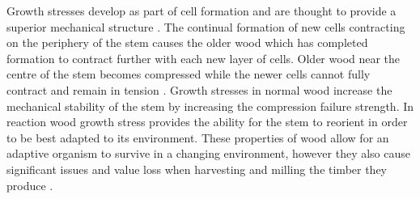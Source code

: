 Growth stresses develop as part of cell formation and are thought to provide a
superior mechanical structure \cite{mattheck1997wood}. The continual formation of new cells contracting
on the periphery of the stem causes the older wood which has completed formation
to contract further with each new layer of cells. Older wood near the centre
of the stem becomes compressed while the newer cells cannot fully contract and
remain in tension \cite{Archer_1987}.
Growth stresses in normal wood increase the mechanical stability of the stem by increasing the compression failure strength. In reaction wood growth stress provides the ability for the stem to reorient in
order to be best adapted to its environment. These properties
of wood allow for an adaptive organism to survive in a changing environment,
however they also cause significant issues and value loss when harvesting and
milling the timber they produce \cite{kubler_1987}.
